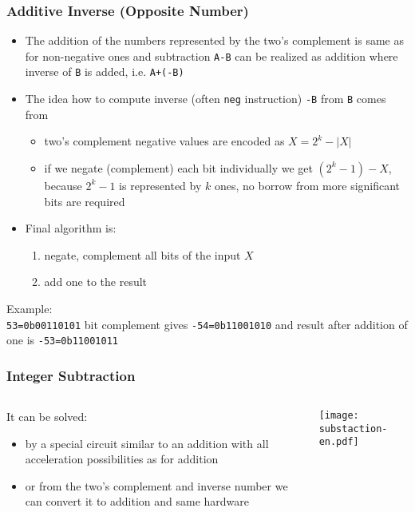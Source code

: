 \documentclass{beamer}
\begin{document}
\begin{frame}
\frametitle{Additive Inverse (Opposite Number)}
\begin{itemize}
\item The addition of the numbers represented by the two's complement is same as for non-negative ones and subtraction \texttt{A-B} can be realized as addition where inverse of \texttt{B} is added, i.e. \texttt{A+(-B)}
\item The idea how to compute inverse (often \texttt{neg} instruction) \texttt{-B} from \texttt{B} comes from
\begin{itemize}
\item two's complement negative values are encoded as $X = 2^k-|X|$
\item if we negate (complement) each bit individually we get $(2^{k}-1)-X$, because $2^{k}-1$ is represented by $k$ ones, no borrow from more significant bits are required
\end{itemize}
\item Final algorithm is:
\begin{enumerate}
\item negate, complement all bits of the input $X$
\item add one to the result
\end{enumerate}
\end{itemize}

Example:\\
\texttt{53=0b00110101} bit complement gives \texttt{-54=0b11001010} and result after addition of one is \texttt{-53=0b11001011}

\end{frame}


\begin{frame}
\frametitle{Integer Subtraction}


\begin{columns}
\begin{column}{0.5\textwidth}
It can be solved:
\begin{itemize}
\item by a special circuit similar to an addition with all acceleration possibilities as for addition
\item or from the two's complement and inverse number we can convert it to addition and same hardware
\end{itemize}
\end{column}
\hfill
\begin{column}{0.5\textwidth}
\begin{center}
\texttt{[image: substaction-en.pdf]}
\end{center}
\end{column}
\end{columns}


\end{frame}
\end{document}
